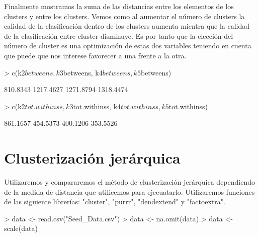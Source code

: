 \documentclass [a4paper] {article}
\begin{document}
Finalmente mostramos la suma de las distancias entre los elementos de los clusters y entre los clusters.
Vemos como al aumentar el número de clusters la calidad de la clasificación dentro de los clusters aumenta mientra que la calidad de la clasificación entre cluster disminuye.
Es por tanto que la elección del número de cluster es una optimización de estas dos variables teniendo en cuenta que puede que nos interese favorecer a una frente a la otra.
\begin{Schunk}
\begin{Sinput}
> c(k2$betweens, k3$betweens, k4$betweens, k5$betweens)
\end{Sinput}
\begin{Soutput}
[1]  810.8343 1217.4627 1271.8794 1318.4474
\end{Soutput}
\begin{Sinput}
> c(k2$tot.withinss, k3$tot.withinss, k4$tot.withinss, k5$tot.withinss)
\end{Sinput}
\begin{Soutput}
[1] 861.1657 454.5373 400.1206 353.5526
\end{Soutput}
\end{Schunk}

\newpage
\section{Clusterización jerárquica}
Utilizaremos y compararemos el método de clusterización jerárquica dependiendo de la medida de distancia que utilicemos para ejecuatarlo.
Utilizaremos funciones de las siguiente librerías: "cluster", "purrr", "dendextend" y "factoextra".

\begin{Schunk}
\begin{Sinput}
> data <- read.csv("Seed_Data.csv")
> data <- na.omit(data)
> data <- scale(data)
\end{Sinput}
\end{Schunk}
\end{document}
